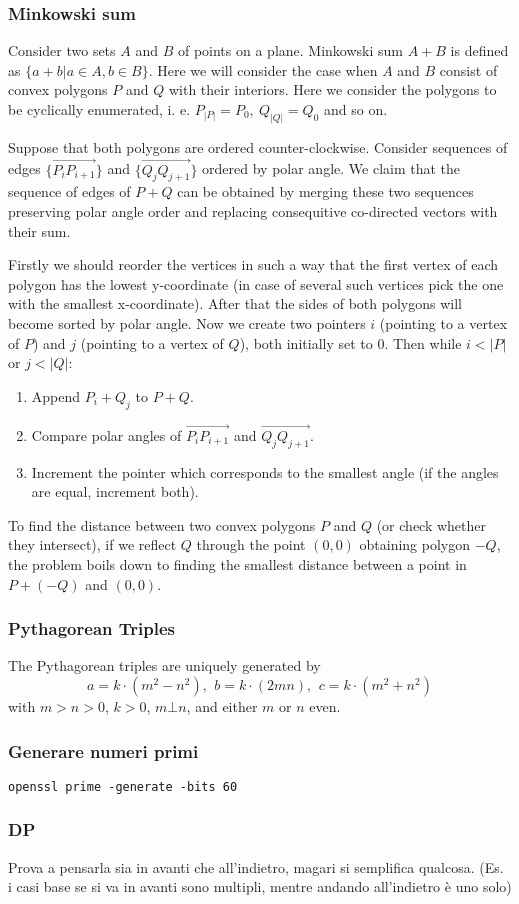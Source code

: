 \subsubsection{Minkowski sum}
Consider two sets $A$ and $B$ of points on a plane. Minkowski sum $A + B$ is defined as $\{a + b| a \in A, b \in B\}$.
Here we will consider the case when $A$ and $B$ consist of convex polygons $P$ and $Q$ with their interiors.
Here we consider the polygons to be cyclically enumerated, i. e. $P_{|P|} = P_0,\ Q_{|Q|} = Q_0$ and so on.

Suppose that both polygons are ordered counter-clockwise. Consider sequences of edges $\{\overrightarrow{P_iP_{i+1}}\}$
and $\{\overrightarrow{Q_jQ_{j+1}}\}$ ordered by polar angle. We claim that the sequence of edges of $P + Q$ can be obtained by merging
these two sequences preserving polar angle order and replacing consequitive co-directed vectors with their sum.

Firstly we should reorder the vertices in such a way that the first vertex
of each polygon has the lowest y-coordinate (in case of several such vertices pick the one with the smallest x-coordinate). After that the sides of both polygons
will become sorted by polar angle.
Now we create two pointers $i$ (pointing to a vertex of $P$) and $j$ (pointing to a vertex of $Q$), both initially set to 0.
Then while $i < |P|$ or $j < |Q|$:
\begin{enumerate}
\item Append $P_i + Q_j$ to $P + Q$.
\item Compare polar angles of $\overrightarrow{P_iP_{i + 1}}$ and $\overrightarrow{Q_jQ_{j+1}}$.
\item Increment the pointer which corresponds to the smallest angle (if the angles are equal, increment both).
\end{enumerate}

To find the distance between two convex polygons $P$ and $Q$ (or check whether they intersect), if we reflect $Q$ through the point $(0, 0)$ obtaining polygon $-Q$, the problem boils down to finding the smallest distance between a point in
$P + (-Q)$ and $(0, 0)$.

\subsubsection{Pythagorean Triples}
 The Pythagorean triples are uniquely generated by $$a=k\cdot (m^{2}-n^{2}),\ \,b=k\cdot (2mn),\ \,c=k\cdot (m^{2}+n^{2})$$
 with $m > n > 0$, $k > 0$, $m \bot n$, and either $m$ or $n$ even.

\subsubsection{Generare numeri primi}
\verb|openssl prime -generate -bits 60|

\subsubsection{DP} Prova a pensarla sia in avanti che all’indietro, magari si semplifica qualcosa. (Es. i casi base se si va in avanti sono multipli, mentre
andando all’indietro è uno solo)
